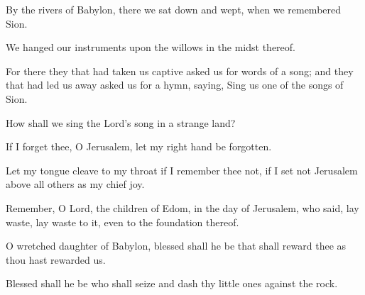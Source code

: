 By the rivers of Babylon, there we sat down and wept, when we remembered Sion.

We hanged our instruments upon the willows in the midst thereof.

For there they that had taken us captive asked us for words of a song; and they that had led us away asked us for a hymn, saying, Sing us one of the songs of Sion.

How shall we sing the Lord's song in a strange land?

If I forget thee, O Jerusalem, let my right hand be forgotten.

Let my tongue cleave to my throat if I remember thee not, if I set not Jerusalem above all others as my chief joy.

Remember, O Lord, the children of Edom, in the day of Jerusalem, who said, lay waste, lay waste to it, even to the foundation thereof.

O wretched daughter of Babylon, blessed shall he be that shall reward thee as thou hast rewarded us.

Blessed shall he be who shall seize and dash thy little ones against the rock.

